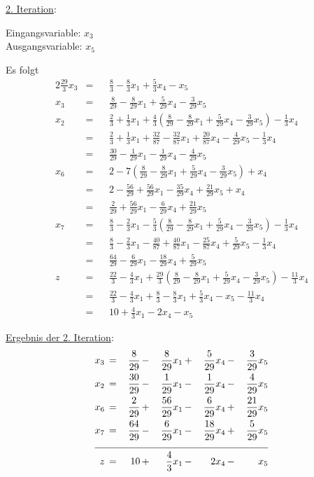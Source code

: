 \documentclass[10pt,a4paper,oneside,ngerman,numbers=noenddot]{scrartcl}
\begin{document}
		\underline{2. Iteration}:
		
		Eingangsvariable: $x_{3}$ \\
		Ausgangsvariable: $x_{5}$
		
		Es folgt
		\begin{alignat*}{2}
			\frac{29}{3}x_{3} &=&& \frac{8}{3} - \frac{8}{3}x_{1} + \frac{5}{3}x_{4} - x_{5} \\
			x_{3} &=&& \frac{8}{29} - \frac{8}{29}x_{1} + \frac{5}{29}x_{4} - \frac{3}{29}x_{5} \\
			x_{2} &=&& \frac{2}{3} + \frac{1}{3}x_{1} + \frac{4}{3}\left(\frac{8}{29} - \frac{8}{29}x_{1} + \frac{5}{29}x_{4} - \frac{3}{29}x_{5}\right) - \frac{1}{3}x_{4} \\
			&=&& \frac{2}{3} + \frac{1}{3}x_{1} + \frac{32}{87} - \frac{32}{87}x_{1} + \frac{20}{87}x_{4} - \frac{4}{29}x_{5} - \frac{1}{3}x_{4} \\
			&=&& \frac{30}{29} - \frac{1}{29}x_{1} - \frac{1}{29}x_{4} - \frac{4}{29}x_{5} \\
			x_{6} &=&& 2 - 7\left(\frac{8}{29} - \frac{8}{29}x_{1} + \frac{5}{29}x_{4} - \frac{3}{29}x_{5}\right) + x_{4} \\
			&=&& 2 - \frac{56}{29} + \frac{56}{29}x_{1} - \frac{35}{29}x_{4} + \frac{21}{29}x_{5} + x_{4} \\
			&=&& \frac{2}{29} + \frac{56}{29}x_{1} - \frac{6}{29}x_{4} + \frac{21}{29}x_{5} \\
			x_{7} &=&& \frac{8}{3} - \frac{2}{3}x_{1} - \frac{5}{3}\left(\frac{8}{29} - \frac{8}{29}x_{1} + \frac{5}{29}x_{4} - \frac{3}{29}x_{5}\right) - \frac{1}{3}x_{4} \\
			&=&& \frac{8}{3} - \frac{2}{3}x_{1} - \frac{40}{87} + \frac{40}{87}x_{1} - \frac{25}{87}x_{4} + \frac{5}{29}x_{5} - \frac{1}{3}x_{4} \\
			&=&& \frac{64}{29} - \frac{6}{29}x_{1} - \frac{18}{29}x_{4} + \frac{5}{29}x_{5} \\
			z &=&& \frac{22}{3} - \frac{4}{3}x_{1} + \frac{29}{3}\left(\frac{8}{29} - \frac{8}{29}x_{1} + \frac{5}{29}x_{4} - \frac{3}{29}x_{5}\right) - \frac{11}{3}x_{4} \\
			&=&& \frac{22}{3} - \frac{4}{3}x_{1} + \frac{8}{3} - \frac{8}{3}x_{1} + \frac{5}{3}x_{4} - x_{5} - \frac{11}{3}x_{4} \\
			&=&& 10 + \frac{4}{3}x_{1} - 2x_{4} - x_{5}
		\end{alignat*}
		
		\underline{Ergebnis der 2. Iteration}:
		\begin{alignat*}{5}
			x_{3} \,&=&\, \frac{8}{29} \,&-&\, \frac{8}{29}x_{1} \,&+&\, \frac{5}{29}x_{4} \,&-&\, \frac{3}{29}x_{5} \\
			x_{2} \,&=&\, \frac{30}{29} \,&-&\, \frac{1}{29}x_{1} \,&-&\, \frac{1}{29}x_{4} \,&-&\, \frac{4}{29}x_{5} \\
			x_{6} \,&=&\, \frac{2}{29} \,&+&\, \frac{56}{29}x_{1} \,&-&\, \frac{6}{29}x_{4} \,&+&\, \frac{21}{29}x_{5} \\
			x_{7} \,&=&\, \frac{64}{29} \,&-&\, \frac{6}{29}x_{1} \,&-&\, \frac{18}{29}x_{4} \,&+&\, \frac{5}{29}x_{5} \\ \cline{1 - 9}
			z \,&=&\, 10 \,&+&\, \frac{4}{3}x_{1} \,&-&\, 2x_{4} \,&-&\, x_{5}
		\end{alignat*}
		
\end{document}
